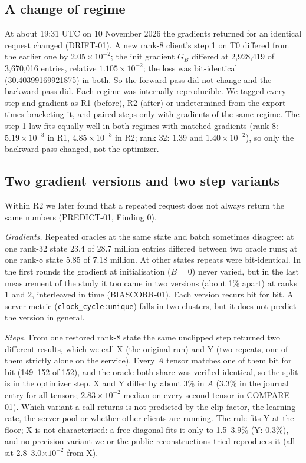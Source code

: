 \documentclass[11pt]{article}
\begin{document}
\subsection{A change of regime}
At about 19:31 UTC on 10 November 2026 the gradients returned for an identical request changed
(DRIFT-01). A new rank-8 client's step 1 on T0 differed from the earlier one by $2.05\times10^{-2}$;
the init gradient $G_B$ differed at 2{,}928{,}419 of 3{,}670{,}016 entries, relative
$1.105\times10^{-2}$; the loss was bit-identical (30.40399169921875) in both. So the forward pass did
not change and the backward pass did. Each regime was internally reproducible. We tagged every step
and gradient as R1 (before), R2 (after) or undetermined from the export times bracketing it, and
paired steps only with gradients of the same regime. The step-1 law fits equally well in both
regimes with matched gradients (rank 8: $5.19\times10^{-3}$ in R1, $4.85\times10^{-3}$ in R2; rank
32: $1.39$ and $1.40\times10^{-2}$), so only the backward pass changed, not the optimizer.

\subsection{Two gradient versions and two step variants}
Within R2 we later found that a repeated request does not always return the same numbers
(PREDICT-01, Finding 0).

\emph{Gradients.} Repeated oracles at the same state and batch sometimes disagree: at one rank-32
state 23.4 of 28.7 million entries differed between two oracle runs; at one rank-8 state 5.85 of
7.18 million. At other states repeats were bit-identical. In the first rounds the gradient at initialisation
($B=0$) never varied, but in the last measurement of the study it too came in two versions (about
1\% apart) at ranks 1 and 2, interleaved in time (BIASCORR-01). Each version recurs bit for bit. A server metric (\texttt{clock\_cycle:unique}) falls in
two clusters, but it does not predict the version in general.

\emph{Steps.} From one restored rank-8 state the same unclipped step returned two different results,
which we call X (the original run) and Y (two repeats, one of them strictly alone on the service).
Every $A$ tensor matches one of them bit for bit (149--152 of 152), and the oracle both share was
verified identical, so the split is in the optimizer step. X and Y differ by about 3\% in $A$
(3.3\% in the journal entry for all tensors; $2.83\times10^{-2}$ median on every second tensor in
COMPARE-01). Which variant a call returns is not predicted by the clip factor, the learning rate, the
server pool or whether other clients are running. The rule fits Y at the floor; X is not
characterised: a free diagonal fits it only to 1.5--3.9\% (Y: 0.3\%), and no precision variant we or
the public reconstructions tried reproduces it (all sit 2.8--3.0$\times10^{-2}$ from X).
\end{document}
